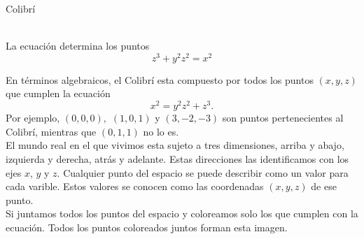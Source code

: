 \documentclass[es]{SurferDesc}%
\begin{document}
\footnotesize

\begin{surferPage}
  \begin{surferTitle}Colibrí\end{surferTitle}   \\
La ecuación determina los puntos\\
  
  \smallskip
\[z^3+ y^2	z^2	= x^2\]

\singlespacing
En términos algebraicos, el Colibrí esta compuesto por todos los puntos $(x, y, z)$ que cumplen la ecuación
\smallskip
\[ x^2= y^2z^2+z^3.\]
\smallskip
Por ejemplo, $(0,0,0),$ $(1,0,1)$ y $(3,-2,-3)$ son puntos pertenecientes al Colibrí, mientras que $(0,1,1)$ no lo es.\\
 \singlespacing
El mundo real en el que vivimos esta sujeto a tres dimensiones, arriba y abajo, izquierda y derecha, atrás y adelante. Estas direcciones las identificamos con los ejes $x$, $y$ y $z$. Cualquier punto del espacio se puede describir como un valor para cada varible. Estos valores se conocen como las coordenadas $(x,y,z)$ de ese punto.\\
\singlespacing
Si juntamos todos los puntos del espacio y coloreamos solo los que cumplen con la ecuación. Todos los puntos coloreados juntos forman esta imagen.\\
\singlespacing


  \begin{surferText}
     \end{surferText}
\end{surferPage}
\end{document}

